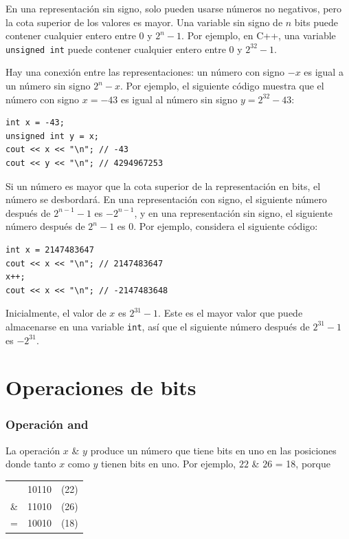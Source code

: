 En una representación sin signo, solo pueden usarse
números no negativos, pero la cota superior de los valores es mayor.
Una variable sin signo de $n$ bits puede contener cualquier
entero entre $0$ y $2^n-1$.
Por ejemplo, en C++, una variable \texttt{unsigned int}
puede contener cualquier entero entre $0$ y $2^{32}-1$.

Hay una conexión entre las
representaciones:
un número con signo $-x$ es igual a un número sin signo $2^n-x$.
Por ejemplo, el siguiente código muestra que
el número con signo $x=-43$ es igual al número
sin signo $y=2^{32}-43$:
\begin{lstlisting}
int x = -43;
unsigned int y = x;
cout << x << "\n"; // -43
cout << y << "\n"; // 4294967253
\end{lstlisting}

Si un número es mayor que la cota superior
de la representación en bits, el número se desbordará.
En una representación con signo,
el siguiente número después de $2^{n-1}-1$ es $-2^{n-1}$,
y en una representación sin signo,
el siguiente número después de $2^n-1$ es $0$.
Por ejemplo, considera el siguiente código:
\begin{lstlisting}
int x = 2147483647
cout << x << "\n"; // 2147483647
x++;
cout << x << "\n"; // -2147483648
\end{lstlisting}

Inicialmente, el valor de $x$ es $2^{31}-1$.
Este es el mayor valor que puede almacenarse
en una variable \texttt{int},
así que el siguiente número después de $2^{31}-1$ es $-2^{31}$.


\section{Operaciones de bits}

\newcommand\XOR{\mathbin{\char`\^}}

\subsubsection{Operación and}


La operación  $x$ \& $y$ produce un número
que tiene bits en uno en las posiciones donde tanto
$x$ como $y$ tienen bits en uno.
Por ejemplo, $22$ \& $26$ = 18, porque

\begin{center}
\begin{tabular}{rrr}
& 10110 & (22)\\
\& & 11010 & (26) \\
\hline
 = & 10010 & (18) \\
\end{tabular}
\end{center}

